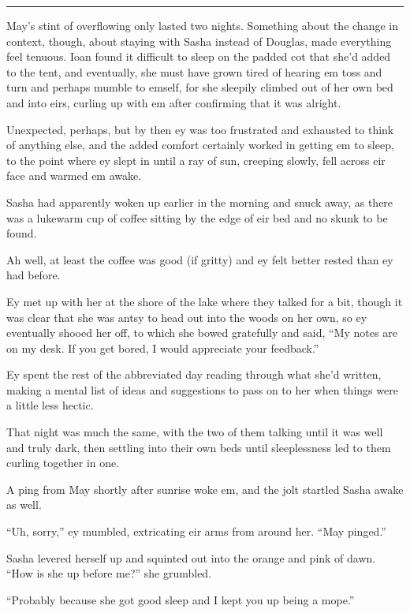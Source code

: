 \begin{center}\rule{0.5\linewidth}{0.5pt}\end{center}

May's stint of overflowing only lasted two nights. Something about the change in context, though, about staying with Sasha instead of Douglas, made everything feel tenuous. Ioan found it difficult to sleep on the padded cot that she'd added to the tent, and eventually, she must have grown tired of hearing em toss and turn and perhaps mumble to emself, for she sleepily climbed out of her own bed and into eirs, curling up with em after confirming that it was alright.

Unexpected, perhaps, but by then ey was too frustrated and exhausted to think of anything else, and the added comfort certainly worked in getting em to sleep, to the point where ey slept in until a ray of sun, creeping slowly, fell across eir face and warmed em awake.

Sasha had apparently woken up earlier in the morning and snuck away, as there was a lukewarm cup of coffee sitting by the edge of eir bed and no skunk to be found.

Ah well, at least the coffee was good (if gritty) and ey felt better rested than ey had before.

Ey met up with her at the shore of the lake where they talked for a bit, though it was clear that she was antsy to head out into the woods on her own, so ey eventually shooed her off, to which she bowed gratefully and said, ``My notes are on my desk. If you get bored, I would appreciate your feedback.''

Ey spent the rest of the abbreviated day reading through what she'd written, making a mental list of ideas and suggestions to pass on to her when things were a little less hectic.

That night was much the same, with the two of them talking until it was well and truly dark, then settling into their own beds until sleeplessness led to them curling together in one.

A ping from May shortly after sunrise woke em, and the jolt startled Sasha awake as well.

``Uh, sorry,'' ey mumbled, extricating eir arms from around her. ``May pinged.''

Sasha levered herself up and squinted out into the orange and pink of dawn. ``How is she up before me?'' she grumbled.

``Probably because she got good sleep and I kept you up being a mope.''

